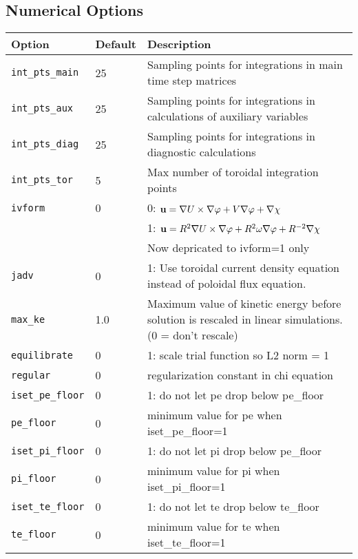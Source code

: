 \subsection{Numerical Options}
\begin{tabular}{llp{4in}}
  \textbf{Option}&\textbf{Default}&\textbf{Description}\\
  \hline
 \texttt{int\_pts\_main}  & 25 & Sampling points for integrations in
                                main time step matrices\\
  \texttt{int\_pts\_aux}   & 25 & Sampling points for integrations in
                                calculations of auxiliary variables\\
  \texttt{int\_pts\_diag}  & 25 & Sampling points for integrations in
                                diagnostic calculations\\
  \texttt{int\_pts\_tor}   & 5 & Max number of toroidal integration points \\
  \texttt{ivform} & 0   & 0: $\mathbf{u} = \nabla U\times\nabla \varphi + V
   \nabla \varphi + \nabla \chi$\\
   & & 1: $\mathbf{u} = R^2 \nabla U\times\nabla \varphi + R^2 \omega
   \nabla \varphi + R^{-2} \nabla \chi$\\
   & & Now depricated to ivform=1 only \\
  \texttt{jadv}   & 0   & 1: Use toroidal current density equation
                          instead of poloidal flux equation.\\
  \texttt{max\_ke}& 1.0  & Maximum value of kinetic energy before solution is
                          rescaled in linear simulations. (0 = don't rescale)\\
  \texttt{equilibrate} & 0 & 1: scale trial function so L2 norm = 1 \\
  \texttt{regular}     & 0 & regularization constant in chi equation \\
  \texttt{iset\_pe\_floor} & 0 & 1: do not let pe drop below pe\_floor \\
  \texttt{pe\_floor}       & 0 & minimum value for pe when iset\_pe\_floor=1 \\

 \texttt{iset\_pi\_floor} & 0 & 1: do not let pi drop below pe\_floor \\
  \texttt{pi\_floor}	   & 0 & minimum value for pi when iset\_pi\_floor=1 \\

 \texttt{iset\_te\_floor} & 0 & 1: do not let te drop below te\_floor \\
  \texttt{te\_floor}	   & 0 & minimum value for te when iset\_te\_floor=1 \\


\end{tabular}
